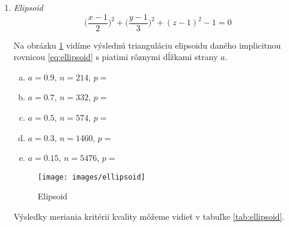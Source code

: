 \begin{enumerate}
{}

\newpage

\item{
    \textit{Elipsoid}
    \begin{equation}
    \label{eq:ellipsoid}
        \bigg ( \frac{x-1}{2} \bigg )^2 + \bigg (\frac{y-1}{3} \bigg )^2 + (z - 1)^2 - 1 = 0
    \end{equation}

    Na obrázku \ref{obr:ellipsoid} vidíme výslednú trianguláciu elipsoidu daného implicitnou 
    rovnicou \ref{eq:ellipsoid} s piatimi rôznymi dĺžkami strany $a$.
    \begin{enumerate}[a)]
    \item{
        $a=0.9$, $n=214$, $p=$
    }
    \item{
        $a=0.7$, $n=332$, $p=$
    }
    \item{
        $a=0.5$, $n=574$, $p=$
    }
    \item{
        $a=0.3$, $n=1460$, $p=$
    }
    \item{
        $a=0.15$, $n=5476$, $p=$
    }
    \end{enumerate}

    \begin{figure}
        \centerline{\texttt{[image: images/ellipsoid]}}
        \caption[Elipsoid]{Elipsoid}
        \label{obr:ellipsoid}
    \end{figure}

    Výsledky meriania kritérii kvality môžeme vidieť v tabuľke \ref{tab:ellipsoid}.

     
  

}
\end{enumerate}
